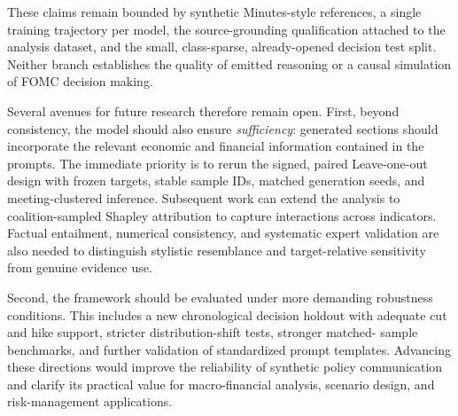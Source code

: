 These claims remain bounded by synthetic Minutes-style references, a single
training trajectory per model, the source-grounding qualification attached to
the analysis dataset, and the small, class-sparse, already-opened decision test
split. Neither branch establishes the quality of emitted reasoning or a causal
simulation of FOMC decision making.


Several avenues for future research therefore remain open. First, beyond
consistency, the model should also ensure \textit{sufficiency}: generated
sections should incorporate the relevant economic and financial information
contained in the prompts. The immediate priority is to rerun the signed,
paired Leave-one-out design with frozen targets, stable sample IDs, matched
generation seeds, and meeting-clustered inference. Subsequent work can extend
the analysis to coalition-sampled Shapley attribution to capture interactions
across indicators. Factual entailment, numerical consistency, and systematic
expert validation are also needed to distinguish stylistic resemblance and
target-relative sensitivity from genuine evidence use.


Second, the framework should be evaluated under more demanding robustness
conditions. This includes a new chronological decision holdout with adequate
cut and hike support, stricter distribution-shift tests, stronger matched-
sample benchmarks, and further validation of standardized prompt templates.
Advancing these directions would improve the reliability of synthetic policy
communication and clarify its practical value for macro-financial analysis,
scenario design, and risk-management applications.


